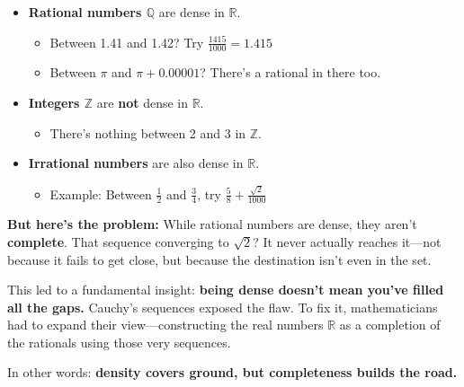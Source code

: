 \begin{itemize}
    \item \textbf{Rational numbers \( \mathbb{Q} \)} are dense in \( \mathbb{R} \).
    \begin{itemize}
        \item Between 1.41 and 1.42? Try \( \frac{1415}{1000} = 1.415 \)
        \item Between \( \pi \) and \( \pi + 0.00001 \)? There’s a rational in there too.
    \end{itemize}

    \item \textbf{Integers \( \mathbb{Z} \)} are \textbf{not} dense in \( \mathbb{R} \).
    \begin{itemize}
        \item There’s nothing between 2 and 3 in \( \mathbb{Z} \).
    \end{itemize}

    \item \textbf{Irrational numbers} are also dense in \( \mathbb{R} \).
    \begin{itemize}
        \item Example: Between \( \frac{1}{2} \) and \( \frac{3}{4} \), try \( \frac{5}{8} + \frac{\sqrt{2}}{1000} \)
    \end{itemize}
\end{itemize}


\textbf{But here’s the problem:} While rational numbers are dense, they aren’t \textbf{complete}. That sequence converging to \( \sqrt{2} \)? It never actually reaches it—not because it fails to get close, but because the destination isn’t even in the set.

This led to a fundamental insight: \textbf{being dense doesn’t mean you’ve filled all the gaps.} Cauchy’s sequences exposed the flaw. To fix it, mathematicians had to expand their view—constructing the real numbers \( \mathbb{R} \) as a completion of the rationals using those very sequences.

In other words: \textbf{density covers ground, but completeness builds the road.}




